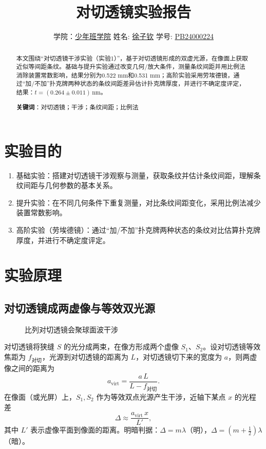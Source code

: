 \documentclass[12pt,a4paper]{article}
\title{\Huge{\textbf{对切透镜实验报告}}}
\author{学院：\uline{少年班学院} \quad 姓名: \uline{徐子钦} \quad 学号: \uline{PB24000224}}
\begin{document}
\maketitle

\begin{abstract}
本文围绕“对切透镜干涉实验（实验1）”，基于对切透镜形成的双虚光源，在像面上获取近似等间距条纹。基础与提升实验通过改变几何/放大条件，测量条纹间距并用比例法消除装置常数影响，结果分别为0.522 mm和0.531 mm；高阶实验采用劳埃德镜，通过“加/不加”扑克牌两种状态的条纹间距差异估计扑克牌厚度，并进行不确定度评定，结果：$t=(0.264\pm0.011)\,\mathrm{nm}$。

\textbf{关键词}：对切透镜；干涉；条纹间距；比例法
\end{abstract}

\section{实验目的}
\begin{enumerate}
	\item 基础实验：搭建对切透镜干涉观察与测量，获取条纹并估计条纹间距，理解条纹间距与几何参数的基本关系。
	\item 提升实验：在不同几何条件下重复测量，对比条纹间距变化，采用比例法减少装置常数影响。
	\item 高阶实验（劳埃德镜）：通过“加/不加”扑克牌两种状态的条纹对比估算扑克牌厚度，并进行不确定度评定。
\end{enumerate}

\section{实验原理}
\subsection*{对切透镜成两虚像与等效双光源}

\begin{figure}[h]
    \centering
    \caption{比列对切透镜会聚球面波干涉}
\end{figure}

对切透镜将狭缝 $S$ 的光分成两束，在像方形成两个虚像 $S_1$、$S_2$。设对切透镜等效焦距为 $f_{\text{对切}}$，光源到对切透镜的距离为 $L$，对切透镜切下来的宽度为 $a$，则两虚像之间的距离为
\[ a_{\text{virt}} = \frac{a\,L}{L - f_{\text{对切}}}. \]
在像面（或光屏）上，$S_1,S_2$ 作为等效双点光源产生干涉，近轴下某点 $x$ 的光程差
\[ \Delta \approx \frac{a_{\text{virt}}\,x}{L'}, \]
其中 $L'$ 表示虚像平面到像面的距离。明暗判据：$\Delta=m\lambda$（明），$\Delta=(m+\tfrac12)\lambda$（暗）。
\end{document}
